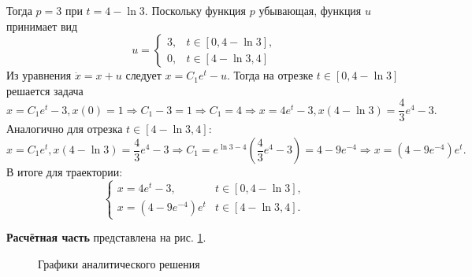 \documentclass[a4paper, 12pt]{article}
\begin{document}
Тогда $p=3$ при $t=4-\ln 3$. Поскольку функция $p$ убывающая, функция $u$ принимает вид
\begin{equation}
    u=
    \begin{cases}
        3, & t \in [0,4-\ln 3],\\
        0, & t \in [4-\ln 3,4]
    \end{cases} 
\end{equation}
Из уравнения $\dot x = x +u$ следует $x=C_1 e^t -u$. Тогда на отрезке $t \in [0,4-\ln 3]$ решается задача
\begin{equation}
    x=C_1 e^t -3,x(0)=1 \Rightarrow C_1 -3 =1 \Rightarrow C_1=4 \Rightarrow x=4 e^t -3, x(4-\ln 3)=\dfrac{4}{3} e^4 -3.
\end{equation}
Аналогично для отрезка $t \in [4-\ln 3,4]$:
\begin{equation}
    x=C_1 e^t,x(4-\ln 3)=\dfrac{4}{3} e^4 -3 \Rightarrow C_1 = e^{\ln 3 - 4} \left(\dfrac{4}{3} e^4 -3  \right)=4- 9 e^{-4} \Rightarrow x=(4-9e^{-4})e^t.
\end{equation}
В итоге для траектории:
\begin{equation}
    \begin{cases}
        x=4 e^t -3, & t \in [0,4-\ln 3],\\
        x=(4-9e^{-4})e^t & t \in [4-\ln 3,4].
    \end{cases}
\end{equation}

{\bf Расчётная часть} представлена на рис. \ref{32}.
\begin{figure}[h]
    \noindent{}
    \caption{Графики аналитического решения}
    \label{32}
\end{figure}
\end{document}
